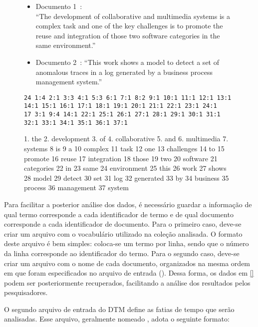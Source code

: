 \begin{figure}
\begin{itemize}
	\item Documento 1~\cite{Kulesza-etal2007}:
	\\``The development of collaborative and multimedia systems is a
	complex task and one of the key challenges is to promote the reuse and
	integration of those two software categories in the same environment.''

	\item Documento 2~\cite{Bezerra-Wainer2006}:
	``This work shows a model to detect a set of anomalous traces in a log
	generated by a business process management system.''
\end{itemize}	

\begin{lstlisting}
24 1:4 2:1 3:3 4:1 5:3 6:1 7:1 8:2 9:1 10:1 11:1 12:1 13:1 14:1 15:1 16:1 17:1 18:1 19:1 20:1 21:1 22:1 23:1 24:1
17 3:1 9:4 14:1 22:1 25:1 26:1 27:1 28:1 29:1 30:1 31:1 32:1 33:1 34:1 35:1 36:1 37:1
\end{lstlisting}

\begin{tabular}
1. the
2. development
3. of
4. collaborative
5. and
6. multimedia
7. systems
8 is
9 a
10 complex
11 task 
12 one
13 challenges
14 to
15 promote
16 reuse
17 integration
18 those
19 two
20 software
21 categories
22 in
23 same
24 environment
25 this
26 work
27 shows
28 model
29 detect
30 set
31 log
32 generated
33 by
34 business
35 process
36 management
37 system
\end{tabular}
\end{figure}

Para facilitar a posterior análise dos dados, é necessário guardar a
informação de qual termo corresponde a cada identificador de termo e 
de qual documento corresponde a cada identificador de documento.
Para o primeiro caso, deve-se criar um arquivo  com o
vocabulário utilizado na coleção analisada. O formato deste arquivo é
bem simples: coloca-se um termo por linha, sendo que o número da linha
corresponde ao identificador do termo. Para o segundo caso, deve-se criar
um arquivo  com o nome de cada documento, organizados na
mesma ordem em que foram especificados no arquivo de entrada ().
Dessa forma, os dados em \cref{} podem ser posteriormente recuperados,
facilitando a análise dos resultados pelos pesquisadores.


O segundo arquivo de entrada do DTM define as fatias de tempo que serão
analisadas. Esse arquivo, geralmente nomeado , adota
o seguinte formato:

